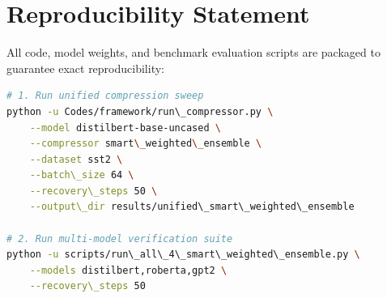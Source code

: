 \section{Reproducibility Statement}
All code, model weights, and benchmark evaluation scripts are packaged to guarantee exact reproducibility:
\begin{lstlisting}[language=bash]
# 1. Run unified compression sweep
python -u Codes/framework/run\_compressor.py \
    --model distilbert-base-uncased \
    --compressor smart\_weighted\_ensemble \
    --dataset sst2 \
    --batch\_size 64 \
    --recovery\_steps 50 \
    --output\_dir results/unified\_smart\_weighted\_ensemble

# 2. Run multi-model verification suite
python -u scripts/run\_all\_4\_smart\_weighted\_ensemble.py \
    --models distilbert,roberta,gpt2 \
    --recovery\_steps 50
\end{lstlisting}
